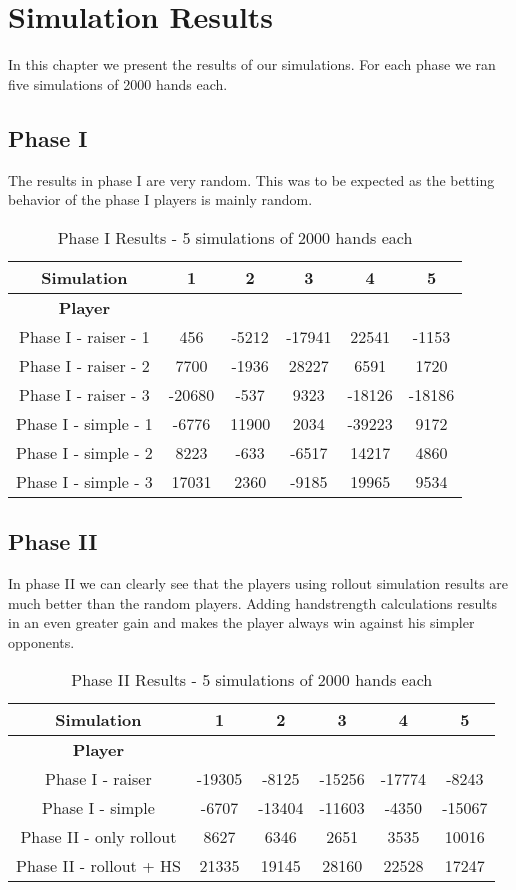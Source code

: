 \section{Simulation Results}
In this chapter we present the results of our simulations. For each phase we ran five simulations of 2000 hands each.

\subsection{Phase I}
The results in phase I are very random. This was to be expected as the betting behavior of the phase I players is mainly
random.

\begin{table}[!h]
\center
\caption{Phase I Results - 5 simulations of 2000 hands each}
\begin{tabular}{ c | c c c c c}
    \textbf{Simulation} & 1 & 2 & 3 & 4 & 5 \\
    \hline
    \textbf{Player} \\
    Phase I - raiser - 1 & 456 & -5212 & -17941 & 22541  & -1153\\
    Phase I - raiser - 2 & 7700 & -1936 & 28227 & 6591   & 1720\\
    Phase I - raiser - 3 & -20680 & -537 & 9323 & -18126 & -18186\\
    Phase I - simple - 1 & -6776 & 11900 & 2034 & -39223 & 9172\\
    Phase I - simple - 2 & 8223 & -633 & -6517 & 14217   & 4860\\
    Phase I - simple - 3 & 17031 & 2360 & -9185 & 19965  & 9534\\
\end{tabular}
\end{table}

\pagebreak

\subsection{Phase II}
In phase II we can clearly see that the players using rollout simulation results are much better than the random
players. Adding handstrength calculations results in an even greater gain and makes the player always win against his
simpler opponents.

\begin{table}[!h]
\center
\caption{Phase II Results - 5 simulations of 2000 hands each}
\begin{tabular}{ c | c c c c c}
    \textbf{Simulation} & 1 & 2 & 3 & 4 & 5 \\
    \hline
    \textbf{Player} \\
    Phase I - raiser        & -19305 & -8125 & -15256 & -17774 & -8243\\
    Phase I - simple        & -6707 & -13404 & -11603 & -4350  & -15067\\
    Phase II - only rollout & 8627  & 6346  & 2651    & 3535   & 10016\\
    Phase II - rollout + HS & 21335 & 19145 & 28160   & 22528  & 17247\\
\end{tabular}
\end{table}

